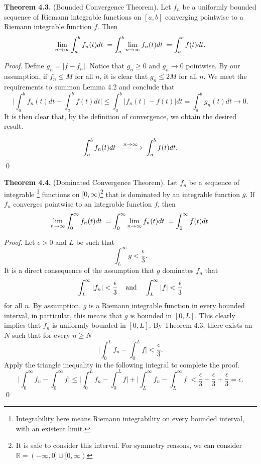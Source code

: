 \documentclass[12pt]{article}
\begin{document}
\vspace{4mm}

\noindent\textbf{Theorem 4.3.} (Bounded Convergence Theorem). Let $f_n$ be a uniformly bounded sequence of Riemann integrable functions on $[a,b]$ converging pointwise to a Riemann integrable function $f$. Then $$\lim_{n\to\infty}\int_a^bf_n(t)dt\hspace{1mm}=\int_a^b\lim_{n\to\infty}f_n(t)dt\hspace{1mm}=\int_a^bf(t)dt.$$

\noindent\textit{Proof}. Define $g_n=|f-f_n|$. Notice that $g_n\geq 0$ and $g_n\to0$ pointwise. By our assumption, if $f_n\leq M$ for all $n$, it is clear that $g_n\leq 2M$ for all $n$. We meet the requirements to summon Lemma 4.2 and conclude that $$\bigg|\int_a^bf_n(t)dt-\int_a^bf(t)dt\bigg|\leq\int_a^b|f_n(t)-f(t)|dt=\int_a^bg_n(t)dt\to 0.$$ It is then clear that, by the definition of convergence, we obtain the desired result.

$$\int_a^bf_n(t)dt\hspace{1mm}\xrightarrow{\hspace{1mm}n\to\infty\hspace{1mm}}\hspace{1mm}\int_a^bf(t)dt.$$
\qed

\vspace{5mm}

\noindent\textbf{Theorem 4.4.} (Dominated Convergence Theorem). Let $f_n$ be a sequence of integrable \footnote{Integrability here means Riemann integrability on every bounded interval, with an existent limit.} functions on $[0,\infty)$\footnote{It is safe to consider this interval. For symmetry reasons, we can consider $\mathbb{R}=(-\infty,0]\cup [0,\infty)$} that is dominated by an integrable function $g$. If $f_n$ converges pointwise to an integrable function $f$, then $$\lim_{n\to\infty}\int_0^\infty f_n(t)dt\hspace{1mm}=\int_0^\infty\lim_{n\to\infty}f_n(t)dt\hspace{1mm}=\int_0^\infty f(t)dt.$$

\noindent\textit{Proof}. Let $\epsilon>0$ and $L$ be such that $$\int_L^\infty g<\frac{\epsilon}{3}.$$ It is a direct consequence of the assumption that $g$ dominates $f_n$ that $$\int_L^\infty |f_n|<\frac{\epsilon}{3} \hspace{4mm}\text{and}\hspace{4mm}\int_L^\infty |f|<\frac{\epsilon}{3}$$ for all $n$. By assumption, $g$ is a Riemann integrable function in every bounded interval, in particular, this means that $g$ is bounded in $[0,L]$. This clearly implies that $f_n$ is uniformly bounded in $[0,L]$. By Theorem 4.3, there exists an $N$ such that for every $n\geq N$ $$\bigg|\int_0^Lf_n-\int_0^Lf\bigg|<\frac{\epsilon}{3}.$$ Apply the triangle inequality in the following integral to complete the proof. $$\bigg|\int_0^\infty f_n-\int_0^\infty f\bigg|\leq\bigg|\int_0^L f_n-\int_0^L f\bigg|+\bigg|\int_L^\infty f_n-\int_L^\infty f\bigg|<\frac{\epsilon}{3}+\frac{\epsilon}{3}+\frac{\epsilon}{3}=\epsilon.$$
\qed
\end{document}
